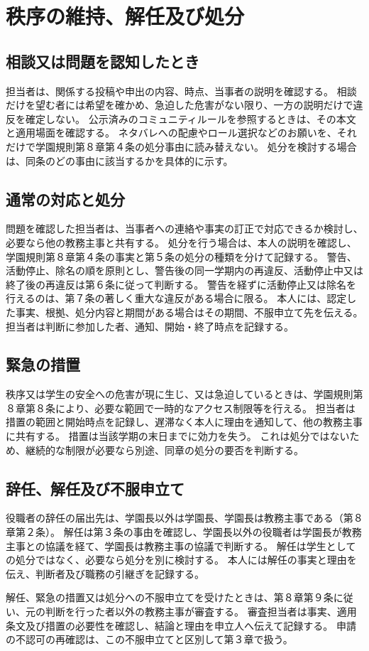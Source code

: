 ﻿\newpage
\chapter{秩序の維持、解任及び処分}

\section{相談又は問題を認知したとき}

担当者は、関係する投稿や申出の内容、時点、当事者の説明を確認する。
相談だけを望む者には希望を確かめ、急迫した危害がない限り、一方の説明だけで違反を確定しない。
公示済みのコミュニティルールを参照するときは、その本文と適用場面を確認する。
ネタバレへの配慮やロール選択などのお願いを、それだけで学園規則第８章第４条の処分事由に読み替えない。
処分を検討する場合は、同条のどの事由に該当するかを具体的に示す。

\section{通常の対応と処分}

問題を確認した担当者は、当事者への連絡や事実の訂正で対応できるか検討し、必要なら他の教務主事と共有する。
処分を行う場合は、本人の説明を確認し、学園規則第８章第４条の事実と第５条の処分の種類を分けて記録する。
警告、活動停止、除名の順を原則とし、警告後の同一学期内の再違反、活動停止中又は終了後の再違反は第６条に従って判断する。
警告を経ずに活動停止又は除名を行えるのは、第７条の著しく重大な違反がある場合に限る。
本人には、認定した事実、根拠、処分内容と期間がある場合はその期間、不服申立て先を伝える。
担当者は判断に参加した者、通知、開始・終了時点を記録する。

\section{緊急の措置}

秩序又は学生の安全への危害が現に生じ、又は急迫しているときは、学園規則第８章第８条により、必要な範囲で一時的なアクセス制限等を行える。
担当者は措置の範囲と開始時点を記録し、遅滞なく本人に理由を通知して、他の教務主事に共有する。
措置は当該学期の末日までに効力を失う。
これは処分ではないため、継続的な制限が必要なら別途、同章の処分の要否を判断する。

\section{辞任、解任及び不服申立て}

役職者の辞任の届出先は、学園長以外は学園長、学園長は教務主事である（第８章第２条）。
解任は第３条の事由を確認し、学園長以外の役職者は学園長が教務主事との協議を経て、学園長は教務主事の協議で判断する。
解任は学生としての処分ではなく、必要なら処分を別に検討する。
本人には解任の事実と理由を伝え、判断者及び職務の引継ぎを記録する。

解任、緊急の措置又は処分への不服申立てを受けたときは、第８章第９条に従い、元の判断を行った者以外の教務主事が審査する。
審査担当者は事実、適用条文及び措置の必要性を確認し、結論と理由を申立人へ伝えて記録する。
申請の不認可の再確認は、この不服申立てと区別して第３章で扱う。
